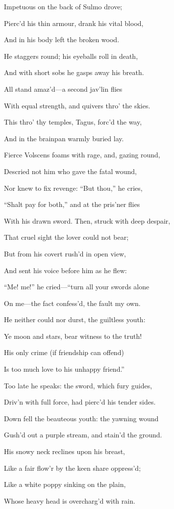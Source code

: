 Impetuous on the back of Sulmo drove;

Pierc’d his thin armour, drank his vital blood,

And in his body left the broken wood.

He staggers round; his eyeballs roll in death,

And with short sobs he gasps away his breath.

All stand amaz’d—a second jav’lin flies

With equal strength, and quivers thro’ the skies.

This thro’ thy temples, Tagus, forc’d the way,

And in the brainpan warmly buried lay.

Fierce Volscens foams with rage, and, gazing round,

Descried not him who gave the fatal wound,

Nor knew to fix revenge: “But thou,” he cries,

“Shalt pay for both,” and at the pris’ner flies

With his drawn sword. Then, struck with deep despair,

That cruel sight the lover could not bear;

But from his covert rush’d in open view,

And sent his voice before him as he flew:

“Me! me!” he cried—“turn all your swords alone

On me—the fact confess’d, the fault my own.

He neither could nor durst, the guiltless youth:

Ye moon and stars, bear witness to the truth!

His only crime (if friendship can offend)

Is too much love to his unhappy friend.”

Too late he speaks: the sword, which fury guides,

Driv’n with full force, had pierc’d his tender sides.

Down fell the beauteous youth: the yawning wound

Gush’d out a purple stream, and stain’d the ground.

His snowy neck reclines upon his breast,

Like a fair flow’r by the keen share oppress’d;

Like a white poppy sinking on the plain,

Whose heavy head is overcharg’d with rain.


